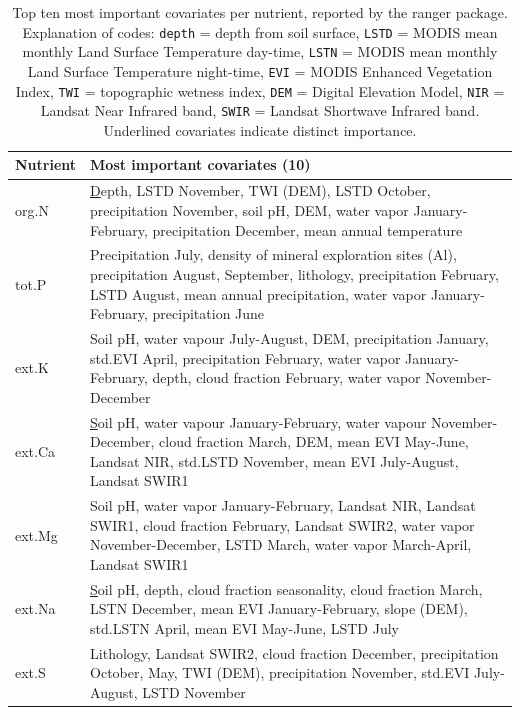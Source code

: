 \begin{linenumbers}
\begin{table}
\centering
\caption{Top ten most important covariates per nutrient, reported by the \textsf{ranger} package. Explanation of codes: \texttt{depth} = depth from soil surface, \texttt{LSTD} = MODIS mean monthly Land Surface Temperature day-time, \texttt{LSTN} = MODIS mean monthly Land Surface Temperature night-time, \texttt{EVI} = MODIS Enhanced Vegetation Index, \texttt{TWI} = topographic wetness index, \texttt{DEM} = Digital Elevation Model, \texttt{NIR} = Landsat Near Infrared band, \texttt{SWIR} = Landsat Shortwave Infrared band. Underlined covariates indicate distinct importance.}\label{Tbl:results_fit2}
{\footnotesize
\begin{tabular}{m{}m{}}
\toprule
Nutrient  & Most important covariates (10)  \\
\midrule
org.\@ N   & {\ul Depth}, LSTD November, TWI (DEM), LSTD October, precipitation November, soil pH, DEM, water vapor January-February, precipitation December, mean annual temperature   \\ \midrule
tot.\@ P   & Precipitation July, density of mineral exploration sites (Al), precipitation August, September, lithology, precipitation February, LSTD August, mean annual precipitation, water vapor January-February, precipitation June    \\ \midrule
ext.\@ K   & Soil pH, water vapour July-August, DEM, precipitation January, std.\@ EVI April, precipitation February, water vapor January-February, depth, cloud fraction February, water vapor November-December   \\ \midrule
ext.\@ Ca  &  {\ul Soil pH}, water vapour January-February, water vapour November-December, cloud fraction March, DEM, mean EVI May-June, Landsat NIR, std.\@ LSTD November, mean EVI July-August, Landsat SWIR1  \\ \midrule
ext.\@ Mg  & Soil pH, water vapor January-February, Landsat NIR, Landsat SWIR1, cloud fraction February, Landsat SWIR2, water vapor November-December, LSTD March, water vapor March-April, Landsat SWIR1   \\ \midrule
ext.\@ Na  & {\ul Soil pH}, depth, cloud fraction seasonality, cloud fraction March, LSTN December, mean EVI January-February, slope (DEM), std.\@ LSTN April, mean EVI May-June, LSTD July  \\ \midrule
ext.\@ S   & Lithology, Landsat SWIR2, cloud fraction December, precipitation October, May, TWI (DEM), precipitation November, std.\@ EVI July-August, LSTD November   \\ \midrule

\end{tabular}}
\end{table}
\end{linenumbers}
